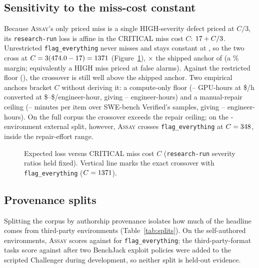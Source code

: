 \documentclass[11pt]{article}
\newcommand{\assay}{\textsc{Assay}}
\newcommand{\fe}{\texttt{flag\_everything}}
\begin{document}
\subsection{Sensitivity to the miss-cost constant}
\label{sec:cost}

Because \assay{}'s only priced miss is a single HIGH-severity defect priced at $C/3$, its
\texttt{research-run} loss is affine in the CRITICAL miss cost $C$: $17{} + C/3$.
Unrestricted \fe{} never misses and stays constant at \lossFlagEverything{}, so the two cross at
$C = 3(474.0{} - 17{}) = 1371{}$ (Figure~\ref{fig:cost}),
\critCrossRatio{}$\times$ the shipped anchor of \critShipped{} (a \critErrPct{}\% margin;
equivalently a HIGH miss priced at \highCross{} false alarms). Against the restricted floor
(\floorRestricted{}), the crossover is still well above the shipped anchor. Two empirical anchors
bracket $C$ without deriving it: a compute-only floor (\costGpuLo--\costGpuHi{} GPU-hours at
\$\costSpot{}/h converted at \$\costEngLo--\$\costEngHi{}/engineer-hour, giving
\costFloorLo--\costFloorHi{} engineer-hours) and a manual-repair ceiling (\costMinLo--\costMinHi{}
minutes per item over SWE-bench Verified's \costSamples{} samples, giving
\costCeilLo--\costCeilHi{} engineer-hours). On the full corpus the crossover exceeds the repair
ceiling; on the \nExternal{}-environment external split, however, \assay{} crosses \fe{} at
$C = 348{}$, inside the repair-effort range.

\begin{figure}[t]\centering

\caption{Expected loss versus CRITICAL miss cost $C$ (\texttt{research-run} severity ratios held
fixed). Vertical line marks the exact crossover with \fe{} ($C=1371{}$).}
\label{fig:cost}
\end{figure}

\subsection{Provenance splits}
\label{sec:splits}

Splitting the corpus by authorship provenance isolates how much of the headline comes from
third-party environments (Table~\ref{tab:splits}). On the \nSelfAuthored{} self-authored
environments, \assay{} scores \selfLossAssay{} against \selfLossFloor{} for \fe{}; the
\tpfN{} third-party-format tasks score \tpfLossAssay{} against \tpfLossFloor{} after two BenchJack
exploit policies were added to the scripted Challenger during development, so neither split is
held-out evidence.
\end{document}
